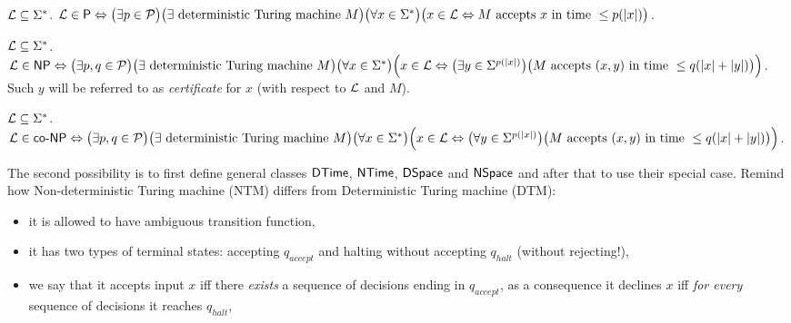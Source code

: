 		\begin{defn}\label{def:P}
			${\cal L} \subseteq \Sigma^*$. ${\cal L} \in \P \iff \bigl(\exists p \in {\cal P}\bigr) \bigl(\exists \textnormal{ deterministic Turing machine } M\bigr)\\ \bigl(\forall x \in \Sigma^*\bigr) \bigl(x \in {\cal L} \iff M \textnormal{ accepts } x \textnormal{ in time } \leq p(|x|)\bigr)$.
		\end{defn}
		
		\begin{defn}\label{def:NP}
			${\cal L} \subseteq \Sigma^*$. ${\cal L} \in \NP \iff \bigl(\exists p, q \in {\cal P}\bigr) \bigl(\exists \textnormal{ deterministic Turing machine } M\bigr)\\ \bigl(\forall x \in \Sigma^*\bigr) \Bigl(x \in {\cal L} \iff \bigl(\exists y \in \Sigma^{p(|x|)}\bigr) \bigl(M \textnormal{ accepts } (x,y) \textnormal{ in time } \leq q(|x|+|y|)\bigr)\Bigr)$.\\
			Such $y$ will be referred to as {\em certificate} for $x$ (with respect to $\cal L$ and $M$).
		\end{defn}
		
		\begin{defn}\label{def:coNP}
			${\cal L} \subseteq \Sigma^*$. ${\cal L} \in \coNP \iff \bigl(\exists p, q \in {\cal P}\bigr) \bigl(\exists \textnormal{ deterministic Turing machine } M\bigr)\\ \bigl(\forall x \in \Sigma^*\bigr) \Bigl(x \in {\cal L} \iff \bigl(\forall y \in \Sigma^{p(|x|)}\bigr) \bigl(M \textnormal{ accepts } (x,y) \textnormal{ in time } \leq q(|x|+|y|)\bigr)\Bigr)$.
		\end{defn}
		
		The second possibility is to first define general classes $\DTime$, $\NTime$, $\DSpace$ and $\NSpace$ and after that to use their special case. Remind how Non-deterministic Turing machine (NTM) differs from Deterministic Turing machine (DTM):
		\begin{itemize}
			\item it is allowed to have ambiguous transition function,
			\item it has two types of terminal states: accepting $q_{accept}$ and halting without accepting $q_{halt}$ (without rejecting!),
			\item we say that it accepts input $x$ iff there {\em exists} a sequence of decisions ending in $q_{accept}$, as a consequence it declines $x$ iff {\em for every} sequence of decisions it reaches $q_{halt}$,
		\end{itemize}
		
